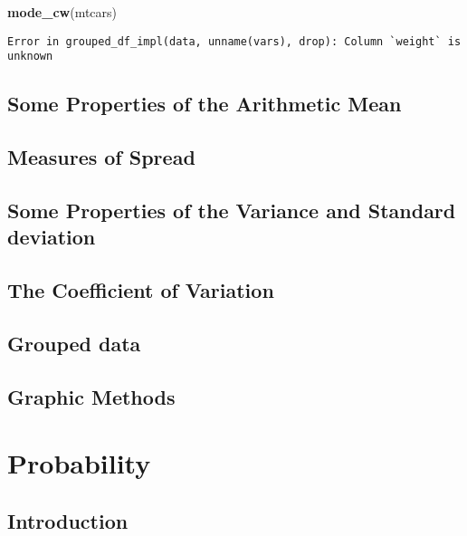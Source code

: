 \documentclass[12pt,]{article}
\newenvironment{Shaded}{\begin{snugshade}}{\end{snugshade}}
\newcommand{\KeywordTok}[1]{\textcolor[rgb]{0.13,0.29,0.53}{\textbf{#1}}}
\newcommand{\NormalTok}[1]{#1}
\theoremstyle{definition}
\theoremstyle{definition}
\theoremstyle{definition}
\theoremstyle{remark}
\begin{document}
\begin{Shaded}
\begin{Highlighting}[]
\KeywordTok{mode_cw}\NormalTok{(mtcars)}
\end{Highlighting}
\end{Shaded}

\begin{verbatim}
Error in grouped_df_impl(data, unname(vars), drop): Column `weight` is unknown
\end{verbatim}

\subsection{Some Properties of the Arithmetic
Mean}\label{some-properties-of-the-arithmetic-mean}

\subsection{Measures of Spread}\label{measures-of-spread}

\subsection{Some Properties of the Variance and Standard
deviation}\label{some-properties-of-the-variance-and-standard-deviation}

\subsection{The Coefficient of
Variation}\label{the-coefficient-of-variation}

\subsection{Grouped data}\label{grouped-data}

\subsection{Graphic Methods}\label{graphic-methods}

\section{Probability}\label{probability}

\subsection{Introduction}\label{introduction-1}
\end{document}
